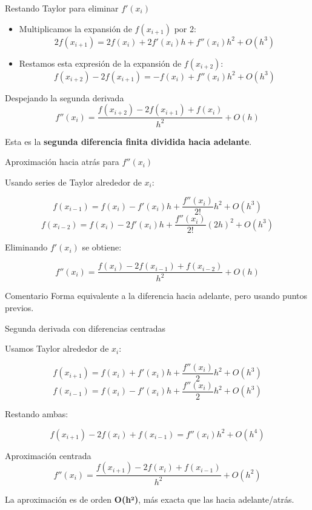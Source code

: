 \documentclass[main.tex]{subfiles}
\begin{document}
\begin{frame}{Restando Taylor para eliminar \(f'(x_i)\)}
\small

\begin{itemize}
  \item Multiplicamos la expansión de \(f(x_{i+1})\) por 2:
\[
2f(x_{i+1}) = 2f(x_i) + 2f'(x_i)h + f''(x_i)h^2 + O(h^3)
\]
  \item Restamos esta expresión de la expansión de \(f(x_{i+2})\):
\[
f(x_{i+2}) - 2f(x_{i+1}) 
= -f(x_i) + f''(x_i)h^2 + O(h^3)
\]
\end{itemize}

\begin{block}{Despejando la segunda derivada}
\[
f''(x_i) = \frac{f(x_{i+2}) - 2f(x_{i+1}) + f(x_i)}{h^2}
+ O(h)
\]
\end{block}

Esta es la \textbf{segunda diferencia finita dividida hacia adelante}.
\end{frame}


\begin{frame}{Aproximación hacia atrás para \(f''(x_i)\)}
\small

Usando series de Taylor alrededor de \(x_i\):

\[
f(x_{i-1}) = f(x_i) - f'(x_i)h 
+ \frac{f''(x_i)}{2!}h^2 + O(h^3)
\]
\[
f(x_{i-2}) = f(x_i) - 2f'(x_i)h 
+ \frac{f''(x_i)}{2!}(2h)^2 + O(h^3)
\]

Eliminando \(f'(x_i)\) se obtiene:

\[
f''(x_i) = \frac{f(x_{i}) - 2f(x_{i-1}) + f(x_{i-2})}{h^2}
+ O(h)
\]

\begin{block}{Comentario}
Forma equivalente a la diferencia hacia adelante, pero usando puntos previos.
\end{block}
\end{frame}

\begin{frame}{Segunda derivada con diferencias centradas}
\small

Usamos Taylor alrededor de \(x_i\):

\[
f(x_{i+1}) = f(x_i) + f'(x_i)h + \frac{f''(x_i)}{2}h^2 + O(h^3)
\]
\[
f(x_{i-1}) = f(x_i) - f'(x_i)h + \frac{f''(x_i)}{2}h^2 + O(h^3)
\]

Restando ambas:

\[
f(x_{i+1}) - 2f(x_i) + f(x_{i-1})
= f''(x_i)h^2 + O(h^4)
\]

\begin{block}{Aproximación centrada}
\[
f''(x_i) = 
\frac{f(x_{i+1}) -2f(x_i) + f(x_{i-1})}{h^2}
+ O(h^2)
\]
\end{block}

La aproximación es de orden \textbf{O(h²)}, más exacta que las hacia adelante/atrás.
\end{frame}
\end{document}
